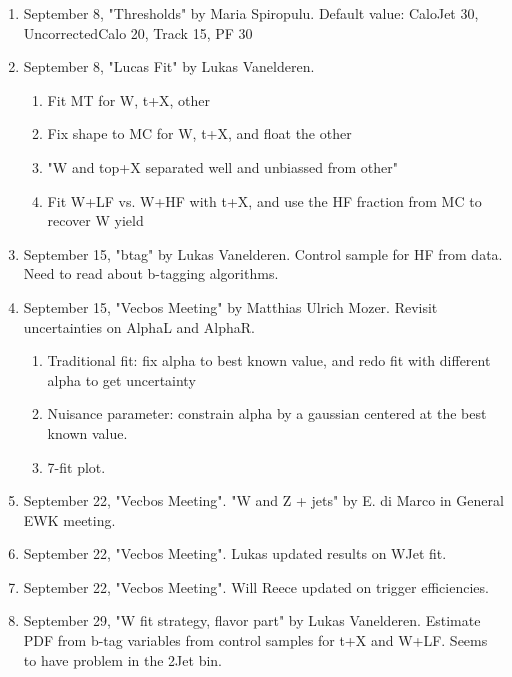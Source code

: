 \begin{enumerate}
\item September 8, "Thresholds" by Maria Spiropulu.   Default value: CaloJet 30, UncorrectedCalo 20, Track 15, PF 30
\item September 8, "Lucas Fit" by Lukas Vanelderen.
   \begin{enumerate}
   \item Fit MT for W, t+X, other
   \item Fix shape to MC for W, t+X, and float the other
   \item "W and top+X separated well and unbiassed from other"
   \item Fit W+LF vs. W+HF with t+X, and use the HF fraction from MC to recover W yield
   \end{enumerate}
\item September 15, "btag" by Lukas Vanelderen.  Control sample for HF from data.  Need to read about b-tagging algorithms.
\item September 15, "Vecbos Meeting" by Matthias Ulrich Mozer.  Revisit uncertainties on AlphaL and AlphaR.
   \begin{enumerate}
   \item Traditional fit: fix alpha to best known value, and redo fit with different alpha to get uncertainty
   \item Nuisance parameter: constrain alpha by a gaussian centered at the best known value.
   \item 7-fit plot.
   \end{enumerate}
\item September 22, "Vecbos Meeting".  "W and Z + jets" by E. di Marco in General EWK meeting.
\item September 22, "Vecbos Meeting".  Lukas updated results on WJet fit.
\item September 22, "Vecbos Meeting".  Will Reece updated on trigger efficiencies.
\item September 29, "W fit strategy, flavor part" by Lukas Vanelderen.
Estimate PDF from b-tag variables from control samples for t+X and W+LF.  Seems to have problem in the 2Jet bin.
\end{enumerate}


